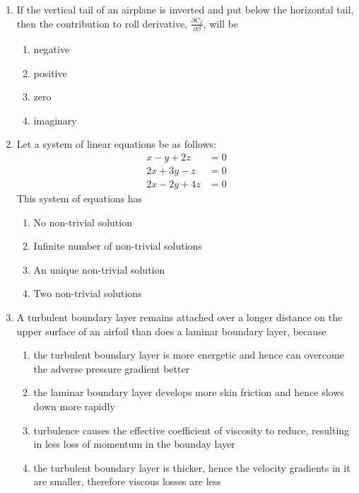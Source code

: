 \documentclass[journal]{IEEEtran}
\begin{document}
\begin{enumerate}
	\item If the vertical tail of an airplane is inverted and put below the horizontal tail, then the contribution to roll derivative, $\frac{\partial C_I}{\partial \beta}$, will be
		\begin{enumerate}
			\item negative
			\item positive
			\item zero
			\item imaginary
		\end{enumerate}
		
		
	\item Let a system of linear equations be as follows:
		\begin{align*}
			x - y + 2z &= 0\\
			2x + 3y - z &= 0\\
			2x-2y+4z &=0
		\end{align*}
		This system of equations has

		\begin{enumerate}
			\item No non-trivial solution
			\item Infinite number of non-trivial solutions
			\item An unique non-trivial solution
			\item Two non-trivial solutions
		\end{enumerate}

	\item A turbulent boundary layer remains attached over a longer distance on the upper surface of an airfoil than does a laminar boundary layer, because
		\begin{enumerate}
			\item the turbulent boundary layer is more energetic and hence can overcome the adverse pressure gradient better
			\item the laminar boundary layer develops more skin friction and hence slows down more rapidly
			\item turbulence causes the effective coefficient of viscosity to reduce, resulting in less loss of momentum in the bounday layer
			\item the turbulent boundary layer is thicker, hence the velocity gradients in it are smaller, therefore viscous losses are less
		\end{enumerate}

\end{enumerate}

  
\end{document}
